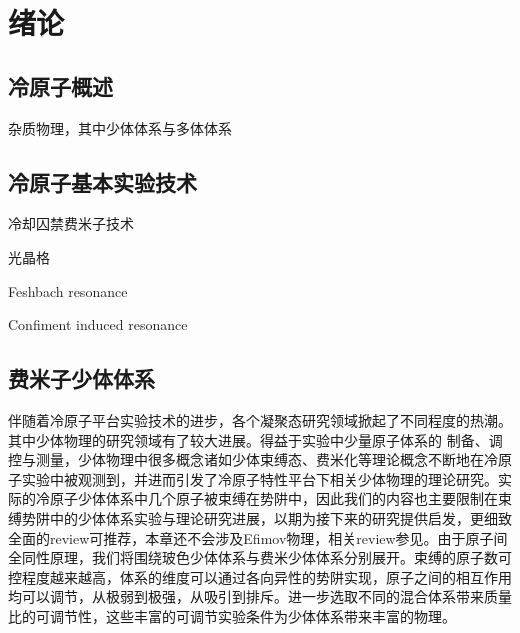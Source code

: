 \chapter{绪论}\label{chap:kondo}

\section{冷原子概述}


杂质物理，其中少体体系与多体体系

\section{冷原子基本实验技术}

冷却囚禁费米子技术

光晶格

Feshbach resonance

Confiment induced resonance

\section{费米子少体体系}\label{sec:fewbody}
伴随着冷原子平台实验技术的进步，各个凝聚态研究领域掀起了不同程度的热潮。其中少体物理的研究领域有了较大进展。得益于实验中少量原子体系的
制备、调控与测量，少体物理中很多概念诸如少体束缚态、费米化等理论概念不断地在冷原子实验中被观测到，并进而引发了冷原子特性平台下相关少体物理的理论研究。实际的冷原子少体体系中几个原子被束缚在势阱中，因此我们的内容也主要限制在束缚势阱中的少体体系实验与理论研究进展，以期为接下来的研究提供启发，更细致全面的review可推荐\cite{sowinski2019one,blume2012few}，本章还不会涉及Efimov物理，相关review参见\cite{nielsen2001three,braaten2006universality,KohlerMolFRRMP}。由于原子间全同性原理，我们将围绕玻色少体体系与费米少体体系分别展开。束缚的原子数可控程度越来越高，体系的维度可以通过各向异性的势阱实现，原子之间的相互作用均可以调节，从极弱到极强，从吸引到排斥。进一步选取不同的混合体系带来质量比的可调节性，这些丰富的可调节实验条件为少体体系带来丰富的物理。


